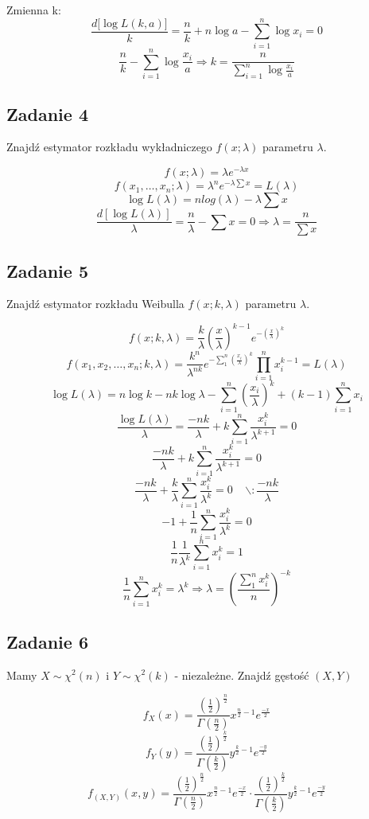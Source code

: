 \documentclass[a4paper]{article}
\begin{document}
Zmienna k:
$$\frac{d[\log{L(k,a)]}}{k} = \frac{n}{k} + n\log{a} - \sum\limits_{i=1}^n \log{x_i} = 0 $$
$$\frac{n}{k} -  \sum\limits_{i=1}^n \log{\frac{x_i}{a}} \Rightarrow k=\frac{n}{ \sum\limits_{i=1}^n \log{\frac{x_i}{a}}}$$


\subsection*{Zadanie 4}
Znajdź estymator rozkładu wykładniczego $f(x;\lambda)$ parametru $\lambda$.

$$f(x;\lambda)=\lambda e^{-\lambda x}$$
$$f(x_1,\dots ,x_n;\lambda)=\lambda^n e^{- \lambda \sum x}=L(\lambda)$$
$$\log{L(\lambda)} = n log(\lambda) - \lambda \sum x$$
$$\frac{d[\log{L(\lambda)}]}{\lambda} = \frac{n}{\lambda} - \sum x  = 0 \Rightarrow \lambda = \frac{n}{\sum x} $$

\subsection*{Zadanie 5}
Znajdź estymator rozkładu Weibulla $f(x;k,\lambda)$ parametru $\lambda$.

$$f(x;k,\lambda) = \frac{k}{\lambda} \left( \frac{x}{\lambda} \right)^{k-1}e^{-\left( \frac{x}{\lambda}\right )^k} $$
$$f(x_1,x_2,\dots ,x_n;k,\lambda) = \frac{k^n}{\lambda^{nk}}e^{-\sum_1^n \left( \frac{x_i}{\lambda} \right)^k  } \prod\limits_{i=1}^n x_i^{k-1} = L(\lambda)  $$
$$\log{L(\lambda)} = n\log{k} - nk\log{\lambda} - \sum_{i=1}^n \left( \frac{x_i}{\lambda} \right)^k + (k-1)\sum_{i=1}^n x_i  $$
$$\frac{\log{L(\lambda)}}{\lambda} = \frac{-nk}{\lambda} + k \sum_{i=1}^n \frac{x_i^k}{\lambda^{k+1}}=0$$
$$\frac{-nk}{\lambda} + k \sum_{i=1}^n \frac{x_i^k}{\lambda^{k+1}}=0 $$
$$\frac{-nk}{\lambda} + \frac{k}{\lambda} \sum_{i=1}^n \frac{x_i^k}{\lambda^{k}}=0 \ \ \ \ \ \backslash : \frac{-nk}{\lambda} $$
$$-1 + \frac{1}{n} \sum_{i=1}^n \frac{x_i^k}{\lambda^{k}}=0$$
$$\frac{1}{n} \frac{1}{\lambda^{k}} \sum_{i=1}^n x_i^k=1$$
$$\frac{1}{n} \sum_{i=1}^n x_i^k=\lambda^k \Rightarrow \lambda = \left( \frac{\sum_1^n x_i^k}{n} \right)^{-k}$$

\subsection*{Zadanie 6}
Mamy $X\sim \chi^2(n)$ i $Y\sim \chi^2(k)$ - niezależne. Znajdź gęstość $(X,Y)$

$$f_X(x)=\frac{\left( \frac{1}{2} \right)^\frac{n}{2}}{\Gamma(\frac{n}{2})} x^{\frac{n}{2}-1}e^{\frac{-x}{2}} $$
$$f_Y(y)=\frac{\left( \frac{1}{2} \right)^\frac{k}{2}}{\Gamma(\frac{k}{2})} y^{\frac{k}{2}-1}e^{\frac{-y}{2}} $$
$$f_{(X,Y)}(x,y) = \frac{\left( \frac{1}{2} \right)^\frac{n}{2}}{\Gamma(\frac{n}{2})} x^{\frac{n}{2}-1}e^{\frac{-x}{2}} \cdot  \frac{\left( \frac{1}{2} \right)^\frac{k}{2}}{\Gamma(\frac{k}{2})} y^{\frac{k}{2}-1}e^{\frac{-y}{2}}$$
\end{document}
